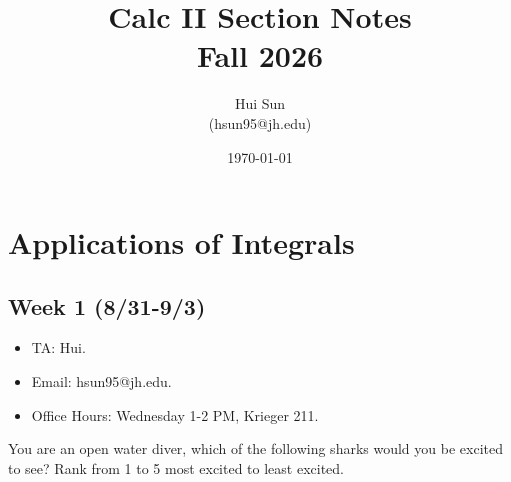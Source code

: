 \documentclass[openany]{book}
\title{Calc II Section Notes
\\ 
\vspace{0.4cm}
\large Fall 2026}
\date{\today}
\author{Hui Sun\\
(hsun95@jh.edu)}
\begin{document}
\maketitle
\tableofcontents

\newpage

\chapter{Applications of Integrals}


\section*{\centering Week 1 (8/31-9/3)}



\begin{itemize}
    \item TA: Hui.
    \item Email: hsun95@jh.edu.
    \item Office Hours: Wednesday 1-2 PM, Krieger 211.
\end{itemize}




\begin{prob}
    You are an open water diver, which of the following sharks would you be excited to see? Rank from 1 to 5 most excited to least excited. 
\end{prob}

    
    
    
    
    
\end{document}
